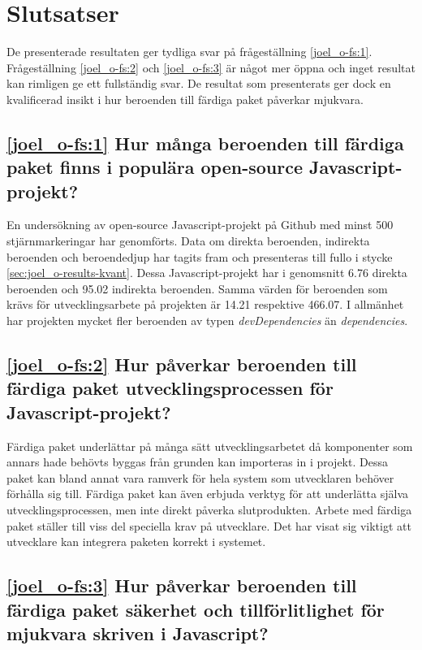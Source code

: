 \section{Slutsatser}
\label{sec:joel_o-conclusion}
De presenterade resultaten ger tydliga svar på frågeställning \ref{joel_o-fs:1}. Frågeställning \ref{joel_o-fs:2} och \ref{joel_o-fs:3} är något mer öppna och inget resultat kan rimligen ge ett fullständig svar. De resultat som presenterats ger dock en kvalificerad insikt i hur beroenden till färdiga paket påverkar mjukvara.

\subsection*{\ref{joel_o-fs:1} Hur många beroenden till färdiga paket finns i populära open-source Javascript-projekt?}

En undersökning av open-source Javascript-projekt på Github med minst 500 stjärnmarkeringar har genomförts. Data om direkta beroenden, indirekta beroenden och beroendedjup har tagits fram och presenteras till fullo i stycke \ref{sec:joel_o-results-kvant}. Dessa Javascript-projekt har i genomsnitt 6.76 direkta beroenden och 95.02 indirekta beroenden. Samma värden för beroenden som krävs för utvecklingsarbete på projekten är 14.21 respektive 466.07. I allmänhet har projekten mycket fler beroenden av typen \textit{devDependencies} än \textit{dependencies}.

\subsection*{\ref{joel_o-fs:2} Hur påverkar beroenden till färdiga paket utvecklingsprocessen för Javascript-projekt?}

Färdiga paket underlättar på många sätt utvecklingsarbetet då komponenter som annars hade behövts byggas från grunden kan importeras in i projekt. Dessa paket kan bland annat vara ramverk för hela system som utvecklaren behöver förhålla sig till. Färdiga paket kan även erbjuda verktyg för att underlätta själva utvecklingsprocessen, men inte direkt påverka slutprodukten. Arbete med färdiga paket ställer till viss del speciella krav på utvecklare. Det har visat sig viktigt att utvecklare kan integrera paketen korrekt i systemet.

\subsection*{\ref{joel_o-fs:3} Hur påverkar beroenden till färdiga paket säkerhet och tillförlitlighet för mjukvara skriven i Javascript?}

